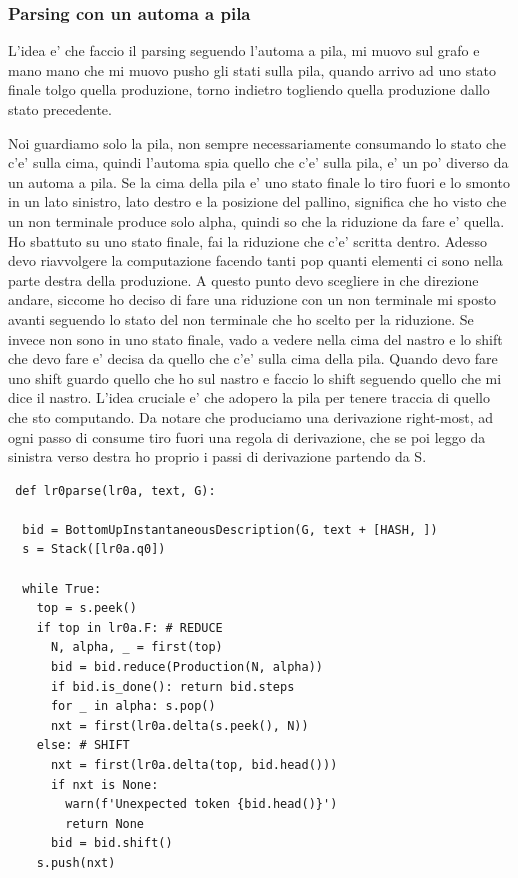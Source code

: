 \subsubsection{Parsing con un automa a pila}
L'idea e' che faccio il parsing seguendo l'automa a pila, mi muovo sul grafo e mano mano che mi muovo pusho gli stati sulla pila, quando arrivo ad uno stato finale tolgo quella produzione, torno indietro togliendo quella produzione dallo stato precedente.

Noi guardiamo solo la pila, non sempre necessariamente consumando lo stato che c'e' sulla cima, quindi l'automa spia quello che c'e' sulla pila, e' un po' diverso da un automa a pila.
Se la cima della pila e' uno stato finale lo tiro fuori e lo smonto in un lato sinistro, lato destro e la posizione del pallino, significa che ho visto che un non terminale produce solo alpha, quindi so che la riduzione da fare e' quella. Ho sbattuto su uno stato finale, fai la riduzione che c'e' scritta dentro. Adesso devo riavvolgere la computazione facendo tanti pop quanti elementi ci sono nella parte destra della produzione. A questo punto devo scegliere in che direzione andare, siccome ho deciso di fare una riduzione con un non terminale mi sposto avanti seguendo lo stato del non terminale che ho scelto per la riduzione.
Se invece non sono in uno stato finale, vado a vedere nella cima del nastro e lo shift che devo fare e' decisa da quello che c'e' sulla cima della pila. Quando devo fare uno shift guardo quello che ho sul nastro e faccio lo shift seguendo quello che mi dice il nastro.
L'idea cruciale e' che adopero la pila per tenere traccia di quello che sto computando.
Da notare che produciamo una derivazione right-most, ad ogni passo di consume tiro fuori una regola di derivazione, che se poi leggo da sinistra verso destra ho proprio i passi di derivazione partendo da S.

\begin{lstlisting}
 def lr0parse(lr0a, text, G):

  bid = BottomUpInstantaneousDescription(G, text + [HASH, ])
  s = Stack([lr0a.q0])
  
  while True:
    top = s.peek()
    if top in lr0a.F: # REDUCE
      N, alpha, _ = first(top)
      bid = bid.reduce(Production(N, alpha))
      if bid.is_done(): return bid.steps
      for _ in alpha: s.pop()
      nxt = first(lr0a.delta(s.peek(), N))
    else: # SHIFT
      nxt = first(lr0a.delta(top, bid.head()))
      if nxt is None: 
        warn(f'Unexpected token {bid.head()}')
        return None
      bid = bid.shift()
    s.push(nxt) 
\end{lstlisting}

